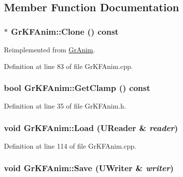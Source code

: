 \subsection{Member Function Documentation}
\hypertarget{class_gr_k_f_anim_5392ada1053eff8dcb27fa727e107f79}{
\subsubsection[{Clone}]{ $\ast$ GrKFAnim::Clone () const}}
\label{class_gr_k_f_anim_5392ada1053eff8dcb27fa727e107f79}




Reimplemented from \hyperlink{class_gr_anim_2964f4d1c2a3b51ff301b03590d26bac}{GrAnim}.

Definition at line 83 of file GrKFAnim.cpp.\hypertarget{class_gr_k_f_anim_31b6c71e8e7382814e55f88a8d8f93a9}{
\subsubsection[{GetClamp}]{\setlength{\rightskip}{0pt plus 5cm}bool GrKFAnim::GetClamp () const}}
\label{class_gr_k_f_anim_31b6c71e8e7382814e55f88a8d8f93a9}




Definition at line 35 of file GrKFAnim.h.\hypertarget{class_gr_k_f_anim_16030b5b8f3c4711713f791ad3e937df}{
\subsubsection[{Load}]{\setlength{\rightskip}{0pt plus 5cm}void GrKFAnim::Load ({\bf UReader} \& {\em reader})}}
\label{class_gr_k_f_anim_16030b5b8f3c4711713f791ad3e937df}




Definition at line 114 of file GrKFAnim.cpp.\hypertarget{class_gr_k_f_anim_698bd445e35a2f55b87accdbf2f63f96}{
\subsubsection[{Save}]{\setlength{\rightskip}{0pt plus 5cm}void GrKFAnim::Save ({\bf UWriter} \& {\em writer})}}
\label{class_gr_k_f_anim_698bd445e35a2f55b87accdbf2f63f96}




